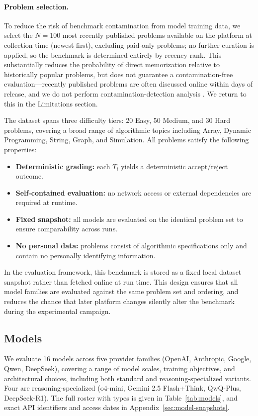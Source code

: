\documentclass{article}
\begin{document}
\paragraph{Problem selection.} To reduce the risk of benchmark contamination from model training data, we select the $N=100$ most recently published problems available on the platform at collection time (newest first), excluding paid-only problems; no further curation is applied, so the benchmark is determined entirely by recency rank. This substantially reduces the probability of direct memorization relative to historically popular problems, but does not guarantee a contamination-free evaluation---recently published problems are often discussed online within days of release, and we do not perform contamination-detection analysis \citep{deng2023investigating}. We return to this in the Limitations section.

The dataset spans three difficulty tiers: 20 Easy, 50 Medium, and 30 Hard problems, covering a broad range of algorithmic topics including Array, Dynamic Programming, String, Graph, and Simulation. All problems satisfy the following properties:
\begin{itemize}
  \item \textbf{Deterministic grading:} each $T_i$ yields a deterministic accept/reject outcome.
  \item \textbf{Self-contained evaluation:} no network access or external dependencies are required at runtime.
  \item \textbf{Fixed snapshot:} all models are evaluated on the identical problem set to ensure comparability across runs.
  \item \textbf{No personal data:} problems consist of algorithmic specifications only and contain no personally identifying information.
\end{itemize}

In the evaluation framework, this benchmark is stored as a fixed local dataset snapshot rather than fetched online at run time. This design ensures that all model families are evaluated against the same problem set and ordering, and reduces the chance that later platform changes silently alter the benchmark during the experimental campaign.

\subsection{Models}

We evaluate 16 models across five provider families (OpenAI, Anthropic, Google, Qwen, DeepSeek), covering a range of model scales, training objectives, and architectural choices, including both standard and reasoning-specialized variants. Four are reasoning-specialized (o4-mini, Gemini 2.5 Flash+Think, QwQ-Plus, DeepSeek-R1). The full roster with types is given in Table~\ref{tab:models}, and exact API identifiers and access dates in Appendix~\ref{sec:model-snapshots}.
\end{document}
